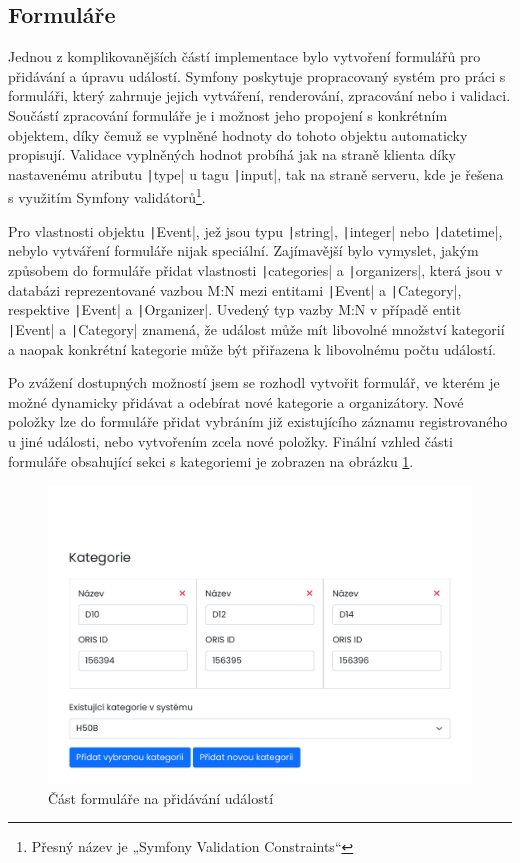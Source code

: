 \subsection{Formuláře}
Jednou z komplikovanějších částí implementace bylo vytvoření formulářů pro přidávání a úpravu událostí. Symfony poskytuje propracovaný systém pro práci s formuláři, který zahrnuje jejich vytváření, renderování, zpracování nebo i validaci. Součástí zpracování formuláře je i možnost jeho propojení s konkrétním objektem, díky čemuž se vyplněné hodnoty do tohoto objektu automaticky propisují. Validace vyplněných hodnot probíhá jak na straně klienta díky nastavenému atributu \texttt|type| u tagu \texttt|input|, tak na straně serveru, kde je řešena s využitím Symfony validátorů\footnote{Přesný název je „Symfony Validation Constraints“}.

Pro vlastnosti objektu \texttt|Event|, jež jsou typu \texttt|string|, \texttt|integer| nebo \texttt|datetime|, nebylo vytváření formuláře nijak speciální. Zajímavější bylo vymyslet, jakým způsobem do formuláře přidat vlastnosti \texttt|categories| a \texttt|organizers|, která jsou v databázi reprezentované vazbou M:N mezi entitami \texttt|Event| a \texttt|Category|, respektive \texttt|Event| a \texttt|Organizer|. Uvedený typ vazby M:N v případě entit \texttt|Event| a \texttt|Category| znamená, že událost může mít libovolné množství kategorií a naopak konkrétní kategorie může být přiřazena k libovolnému počtu událostí.

Po zvážení dostupných možností jsem se rozhodl vytvořit formulář, ve kterém je možné dynamicky přidávat a odebírat nové kategorie a organizátory. Nové položky lze do formuláře přidat vybráním již existujícího záznamu registrovaného u jiné události, nebo vytvořením zcela nové položky. Finální vzhled části formuláře obsahující sekci s kategoriemi je zobrazen na obrázku \ref{figure:form}.

\begin{figure}[h]
    \caption{Část formuláře na přidávání událostí}
    \label{figure:form}
    \centering
    \includegraphics[width=0.95\linewidth]{images/form.pdf}
\end{figure}

